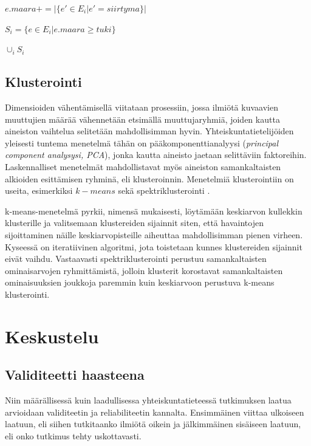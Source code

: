\documentclass[finnish,gradu,twoside,12pt]{tktltiki}
\begin{document}
{\begin{algorithm}
		\State $e.maara += |\{e' \in E_i | e' = siirtyma \}|$
	\EndForAll  
  
  \State $S_i = \{e \in E_i | e.maara \geq tuki \}$
\EndWhile

\Return $\cup_i S_i$
\end{algorithm}


\subsection{Klusterointi}

Dimensioiden vähentämisellä viitataan prosessiin, jossa ilmiötä kuvaavien muuttujien määrää vähennetään etsimällä muuttujaryhmiä, joiden kautta aineiston vaihtelua selitetään mahdollisimman hyvin. Yhteiskuntatietelijöiden yleisesti tuntema menetelmä tähän on pääkomponenttianalyysi (\textit{principal component analysysi, PCA}), jonka kautta aineisto jaetaan selittäviin faktoreihin.  Laskennalliset menetelmät mahdollistavat myös aineiston samankaltaisten alkioiden esittämisen ryhminä, eli klusteroinnin. Menetelmiä klusterointiin on useita, esimerkiksi $k-means$ sekä spektriklusterointi \citep[485--586]{Hastie2009}.

k-means-menetelmä pyrkii, nimensä mukaisesti, löytämään keskiarvon kullekkin klusterille ja valitsemaan klustereiden sijainnit siten, että havaintojen sijoittaminen näille keskiarvopisteille aiheuttaa mahdollisimman pienen virheen. Kyseessä on iteratiivinen algoritmi, jota toistetaan kunnes klustereiden sijainnit eivät vaihdu.  Vastaavasti spektriklusterointi perustuu samankaltaisten ominaisarvojen ryhmittämistä, jolloin klusterit korostavat samankaltaisten ominaisuuksien joukkoja paremmin kuin keskiarvoon perustuva k-means klusterointi.


\section{Keskustelu}

\subsection{Validiteetti haasteena}

Niin määrällisessä kuin laadullisessa yhteiskuntatieteessä tutkimuksen laatua arvioidaan validiteetin ja reliabiliteetin kannalta. Ensimmäinen viittaa ulkoiseen laatuun, eli siihen tutkitaanko ilmiötä oikein ja jälkimmäinen sisäiseen laatuun, eli onko tutkimus tehty uskottavasti.

}
\end{document}
